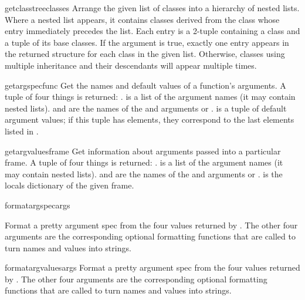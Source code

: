 \begin{funcdesc}{getclasstree}{classes}
  Arrange the given list of classes into a hierarchy of nested lists.
  Where a nested list appears, it contains classes derived from the class
  whose entry immediately precedes the list.  Each entry is a 2-tuple
  containing a class and a tuple of its base classes.  If the 
  argument is true, exactly one entry appears in the returned structure
  for each class in the given list.  Otherwise, classes using multiple
  inheritance and their descendants will appear multiple times.
\end{funcdesc}

\begin{funcdesc}{getargspec}{func}
  Get the names and default values of a function's arguments.
  A tuple of four things is returned: .
   is a list of the argument names (it may contain nested lists).
   and  are the names of the \code{*} and
  \code{**} arguments or .
   is a tuple of default argument values; if this tuple
  has  elements, they correspond to the last  elements
  listed in .
\end{funcdesc}

\begin{funcdesc}{getargvalues}{frame}
  Get information about arguments passed into a particular frame.
  A tuple of four things is returned: .
   is a list of the argument names (it may contain nested
  lists).
   and  are the names of the \code{*} and
  \code{**} arguments or .
   is the locals dictionary of the given frame.
\end{funcdesc}

\begin{funcdesc}{formatargspec}{args}

  Format a pretty argument spec from the four values returned by
  .  The other four arguments are the
  corresponding optional formatting functions that are called to turn
  names and values into strings.
\end{funcdesc}

\begin{funcdesc}{formatargvalues}{args}
  Format a pretty argument spec from the four values returned by
  .  The other four arguments are the
  corresponding optional formatting functions that are called to turn
  names and values into strings.
\end{funcdesc}

